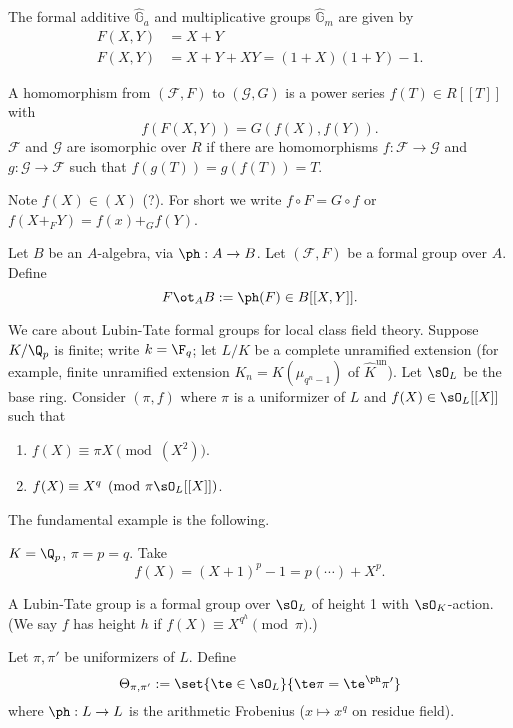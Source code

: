 \begin{ex}
The formal additive $\hat{\mathbb G}_a$ and multiplicative groups $\hat{\mathbb G}_m$ are given by
\begin{align*}
F(X,Y)&=X+Y\\
F(X,Y)&=X+Y+XY=(1+X)(1+Y)-1.
\end{align*}
\end{ex}

\begin{df}
A homomorphism from $(\mathscr F,F)$ to $(\mathscr G,G)$ is a power series $f(T)\in R[[T]]$ with
\[
f(F(X,Y))=G(f(X),f(Y)).
\]
$\mathscr F$ and $\mathscr G$ are isomorphic over $R$ if there are homomorphisms $f:\mathscr F\to \mathscr G$ and $g:\mathscr G\to \mathscr F$ such that $f(g(T))=g(f(T))=T$.
\end{df}
Note $f(X)\in (X)$ (?).
For short we write $f\circ F=G\circ f$ or $f(X+_F Y)=f(x)+_G f(Y)$.
\begin{df}
Let $B$ be an $A$-algebra, via $\ph:A\to B$. Let $(\mathscr F,F)$ be a formal group over $A$. Define
\[
F\ot_A B:=\ph(F)\in B[[X,Y]].
\]
\end{df}
We care about Lubin-Tate formal groups for local class field theory. Suppose $K/\Q_p$ is finite; write $k=\F_q$; let $L/K$ be a complete unramified extension (for example, finite unramified extension $K_n=K(\mu_{q^n-1})$ of $\hat K^{\text{un}}$). Let $\sO_L$ be the base ring. Consider $(\pi, f)$ where $\pi$ is a uniformizer of $L$ and $f(X)\in \sO_L[[X]]$ such that 
\begin{enumerate}
\item
$f(X)\equiv \pi X \pmod{(X^2)}$.
\item
$f(X)\equiv X^q\pmod{\pi\sO_L[[X]]}$.
\end{enumerate}
The fundamental example is the following.
\begin{ex}
$K=\Q_p$, $\pi=p=q$. Take
\[
f(X)=(X+1)^p-1=p(\cdots )+X^p.
\]
\end{ex}
\begin{df}
A Lubin-Tate group is a formal group over $\sO_L$ of height 1 with $\sO_K$-action.
(We say $f$ has height $h$ if $f(X)\equiv X^{q^h}\pmod{\pi}$.)

Let $\pi,\pi'$ be uniformizers of $L$. Define
\[
\Theta_{\pi,\pi'} :=\set{\te\in \sO_L}{\te\pi = \te^{\ph} \pi'}
\]
where $\ph:L\to L$ is the arithmetic Frobenius ($x\mapsto x^q$ on residue field).
\end{df}

